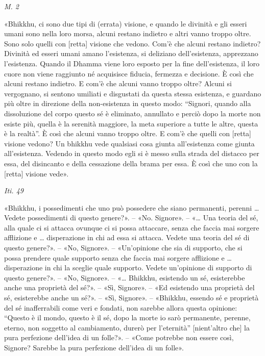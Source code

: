 \emph{M. 2}


«Bhikkhu, ci sono due tipi di (errata) visione, e quando le divinità e
gli esseri umani sono nella loro morsa, alcuni restano indietro e altri
vanno troppo oltre. Sono solo quelli con [retta] visione che vedono.
Com’è che alcuni restano indietro? Divinità ed esseri umani amano
l’esistenza, si deliziano dell’esistenza, apprezzano l’esistenza. Quando
il Dhamma viene loro esposto per la fine dell’esistenza, il loro cuore
non viene raggiunto né acquisisce fiducia, fermezza e decisione. È così
che alcuni restano indietro. E com’è che alcuni vanno troppo oltre?
Alcuni si vergognano, si sentono umiliati e disgustati da questa stessa
esistenza, e guardano più oltre in direzione della non-esistenza in
questo modo: “Signori, quando alla dissoluzione del corpo questo sé è
eliminato, annullato e perciò dopo la morte non esiste più, quella è la
serenità maggiore, la meta superiore a tutte le altre, questa è la
realtà”. È così che alcuni vanno troppo oltre. E com’è che quelli con
[retta] visione vedono? Un bhikkhu vede qualsiasi cosa giunta
all’esistenza come giunta all’esistenza. Vedendo in questo modo egli si
è messo sulla strada del distacco per essa, del disincanto e della
cessazione della brama per essa. È così che uno con la [retta] visione
vede».


\emph{Iti. 49}


«Bhikkhu, i possedimenti che uno può possedere che siano permanenti,
perenni … Vedete possedimenti di questo genere?». – «No. Signore». – «…
Una teoria del sé, alla quale ci si attacca ovunque ci si possa
attaccare, senza che faccia mai sorgere afflizione e … disperazione in
chi ad essa si attacca. Vedete una teoria del sé di questo genere?». –
«No, Signore». – «Un’opinione che sia di supporto, che si possa prendere
quale supporto senza che faccia mai sorgere afflizione e … disperazione
in chi la sceglie quale supporto. Vedete un’opinione di supporto di
questo genere?». – «No, Signore». – «… Bhikkhu, esistendo un sé,
esisterebbe anche una proprietà del sé?». – «Sì, Signore». – «Ed
esistendo una proprietà del sé, esisterebbe anche un sé?». – «Sì,
Signore». – «Bhikkhu, essendo sé e proprietà del sé inafferrabili come
veri e fondati, non sarebbe allora questa opinione: “Questo è il mondo,
questo è il sé, dopo la morte io sarò permanente, perenne, eterno, non
soggetto al cambiamento, durerò per l’eternità” [nient’altro che] la
pura perfezione dell’idea di un folle?». – «Come potrebbe non essere
così, Signore? Sarebbe la pura perfezione dell’idea di un folle».


